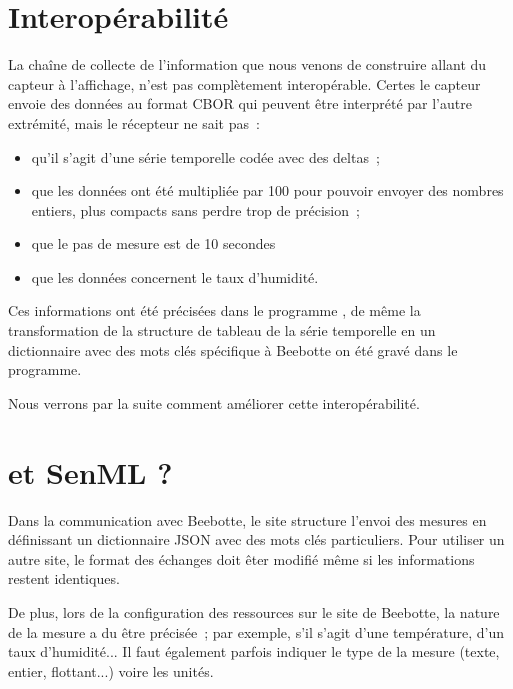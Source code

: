 \section{Interopérabilité}

La chaîne de collecte de l'information que nous venons de construire allant du capteur à l'affichage, n'est pas complètement interopérable. Certes le capteur envoie des données au format CBOR qui peuvent être interprété par l'autre extrémité, mais le récepteur ne sait pas~:
\begin{itemize}
    \item qu'il s'agit d'une série temporelle codée avec des deltas~;
    \item que les données ont été multipliée par 100 pour pouvoir envoyer des nombres entiers, plus compacts sans perdre trop de précision~;
    \item que le pas de mesure est de 10 secondes
    \item que les données concernent le taux d'humidité.
\end{itemize}

Ces informations ont été précisées dans le programme , de même la transformation de la structure de tableau de la série temporelle en un dictionnaire avec des mots clés spécifique à Beebotte on été gravé dans le programme. 

       \vspace{1em}

Nous verrons par la suite comment améliorer cette interopérabilité.

\section{et SenML ?}

Dans la communication avec Beebotte,  le site structure l’envoi des mesures en définissant un dictionnaire JSON avec des mots clés particuliers. Pour utiliser un autre site, le format des échanges doit êter modifié même si les informations restent identiques.

       \vspace{1em}

De plus, lors de la configuration des ressources sur le site de Beebotte, la nature de la mesure a du être précisée~; par exemple, s’il s’agit d’une température, d’un taux d’humidité... Il faut également parfois indiquer le type de la mesure (texte, entier, flottant...) voire les unités. 

       \vspace{1em}

